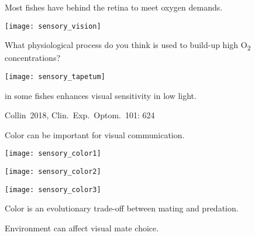 \documentclass[t]{beamer}
\begin{document}
%

\begin{frame}[t]{Most fishes have  behind the retina to meet oxygen demands.}

\vspace{-\baselineskip}

\begin{multicols}{2}
\texttt{[image: sensory\_vision]}

\columnbreak

What physiological process do you think is used to build-up high O\textsubscript{2} concentrations?

\vspace{2\baselineskip}

\texttt{[image: sensory\_tapetum]}

\vspace{0.2\baselineskip}

 in some fishes enhances visual sensitivity in low light.

\end{multicols}

\vfilll

\tinyfill Collin~2018, Clin.~Exp.~Optom.~101: 624

\end{frame}

%

\begin{frame}[t]{Color can be important for visual communication.}

\vspace{-\baselineskip}

\begin{multicols}{2}

\texttt{[image: sensory\_color1]}

\texttt{[image: sensory\_color2]}

\texttt{[image: sensory\_color3]}
\columnbreak

Color is an evolutionary trade-off between mating and predation.

\vspace{9\baselineskip}

Environment can affect visual mate choice.

\end{multicols}

\end{frame}
\end{document}
